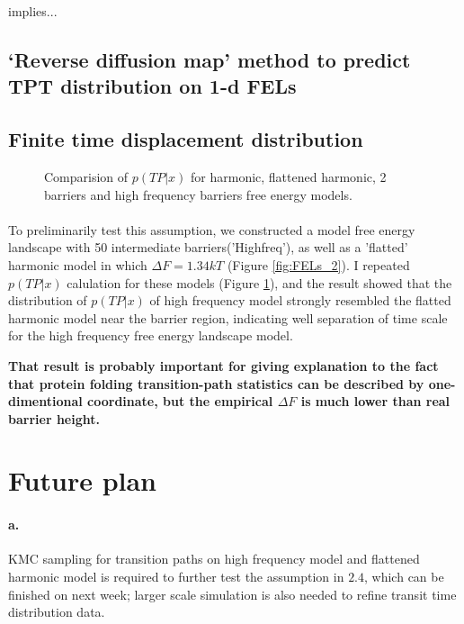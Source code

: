 \documentclass[11pt, a4paper]{article}
\begin{document}
 implies...

\subsection{`Reverse diffusion map' method to predict TPT distribution on 1-d FELs}


\subsection{Finite time displacement distribution}

\begin{figure}[htp]
  \noindent{}
  \caption{Comparision of $p(TP|x)$ for harmonic, flattened harmonic, 2 barriers and high frequency barriers free energy models.}
  \label{fig:tpx_cp}
\end{figure}

\paragraph{}To preliminarily test this assumption, we constructed a model free energy landscape with 50 intermediate barriers('Highfreq'), as well as a 'flatted' harmonic model in which $\Delta F= 1.34 kT$ (Figure \ref{fig:FELs_2}).
I repeated $p(TP|x)$ calulation for these models (Figure \ref{fig:tpx_cp}), and the result showed that the distribution of $p(TP|x)$ of high frequency model strongly resembled the flatted harmonic model near the barrier region,
 indicating well separation of time scale for the high frequency free energy landscape model.

\textbf{That result is probably important for giving explanation to the fact that protein folding transition-path statistics can be described
 by one-dimentional coordinate, but the empirical $\Delta F$ is much lower than real barrier height.}

\section{Future plan}

\paragraph{a.} KMC sampling for transition paths on high frequency model and flattened harmonic model is required to further test the assumption in $2.4$, which can be finished on next week; larger scale simulation is also needed to refine transit time distribution data.
\end{document}
